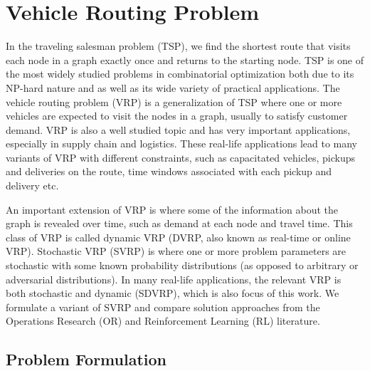 \section{Vehicle Routing Problem}
\label{sec_vrp_intro}

In the traveling salesman problem (TSP), we find the shortest route that visits each node in a graph exactly once and returns to the starting node. TSP is one of the most widely studied problems in combinatorial optimization both due to its NP-hard nature and as well as its wide variety of practical applications. The vehicle routing problem (VRP) is a generalization of TSP where one or more vehicles are expected to visit the nodes in a graph, usually to satisfy customer demand. VRP is also a well studied topic and has very important applications, especially in supply chain and logistics. These real-life applications lead to many variants of VRP with different constraints, such as  capacitated vehicles, pickups and deliveries on the route, time windows associated with each pickup and delivery etc. 

An important extension of VRP is where some of the information about the graph is revealed over time, such as demand at each node and travel time. This class of VRP is called dynamic VRP (DVRP, also known as real-time or online VRP). Stochastic VRP (SVRP) is where one or more problem parameters are stochastic with some known probability distributions (as opposed to arbitrary or adversarial distributions). In many real-life applications, the relevant VRP is both stochastic and dynamic (SDVRP), which is also focus of this work. We formulate a variant of SVRP and compare solution approaches from the Operations Research (OR) and Reinforcement Learning (RL) literature.

\subsection{Problem Formulation}
\label{sec_vrp_pf}

